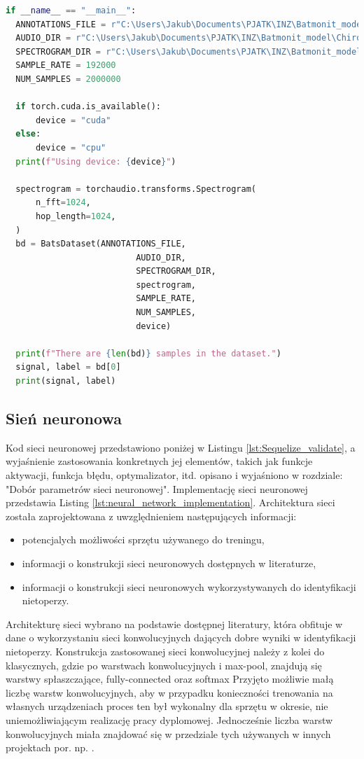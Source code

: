 \documentclass{sprz}
\begin{document}
\begin{lstlisting}[language=Python,caption={Implementacja modułu do ładowania danych}, label={lst:audio-to-spectrogram}]
  if __name__ == "__main__":
  ANNOTATIONS_FILE = r"C:\Users\Jakub\Documents\PJATK\INZ\Batmonit_model\Chiro_sounds_signed\Metadata\Annotations.csv"
  AUDIO_DIR = r"C:\Users\Jakub\Documents\PJATK\INZ\Batmonit_model\Chiro_sounds_signed\Audio"
  SPECTROGRAM_DIR = r"C:\Users\Jakub\Documents\PJATK\INZ\Batmonit_model\Chiro_sounds_signed\Spectrogram"
  SAMPLE_RATE = 192000
  NUM_SAMPLES = 2000000

  if torch.cuda.is_available():
      device = "cuda"
  else:
      device = "cpu"
  print(f"Using device: {device}")

  spectrogram = torchaudio.transforms.Spectrogram(
      n_fft=1024,
      hop_length=1024,
  )
  bd = BatsDataset(ANNOTATIONS_FILE,
                          AUDIO_DIR,
                          SPECTROGRAM_DIR, 
                          spectrogram, 
                          SAMPLE_RATE,
                          NUM_SAMPLES,
                          device)

  print(f"There are {len(bd)} samples in the dataset.")
  signal, label = bd[0]
  print(signal, label)
\end{lstlisting}

\subsection{Sień neuronowa}
Kod sieci neuronowej przedstawiono poniżej w Listingu \ref{lst:Sequelize_validate}, a wyjaśnienie zastosowania konkretnych jej elementów, takich jak funkcje aktywacji, funkcja błędu, optymalizator, itd. opisano i wyjaśniono w rozdziale: "Dobór parametrów sieci neuronowej". Implementację sieci neuronowej przedstawia Listing \ref{lst:neural_network_implementation}.
Architektura sieci została zaprojektowana z uwzględnieniem następujących informacji:
\begin{itemize}
  \item{potencjalych możliwości sprzętu używanego do treningu,}
  \item{informacji o konstrukcji sieci neuronowych dostępnych w literaturze,}
  \item{informacji o konstrukcji sieci neuronowych wykorzystywanych do identyfikacji nietoperzy.}
\end{itemize}

Architekturę sieci wybrano na podstawie dostępnej literatury, która obfituje w dane o wykorzystaniu sieci konwolucyjnych dających dobre wyniki w identyfikacji nietoperzy. Konstrukcja zastosowanej sieci konwolucyjnej należy z kolei do klasycznych, gdzie po warstwach konwolucyjnych i max-pool, znajdują się warstwy spłaszczające, fully-connected oraz softmax \cite{obuchowski}
Przyjęto możliwie małą liczbę warstw konwolucyjnych, aby w przypadku konieczności trenowania na własnych urządzeniach proces ten był wykonalny dla sprzętu w okresie, nie uniemożliwiającym realizację pracy dyplomowej. Jednocześnie liczba warstw konwolucyjnych miała znajdować się w przedziale tych używanych w innych projektach por. np. \cite{bats-id-randomforest}. 
\end{document}
